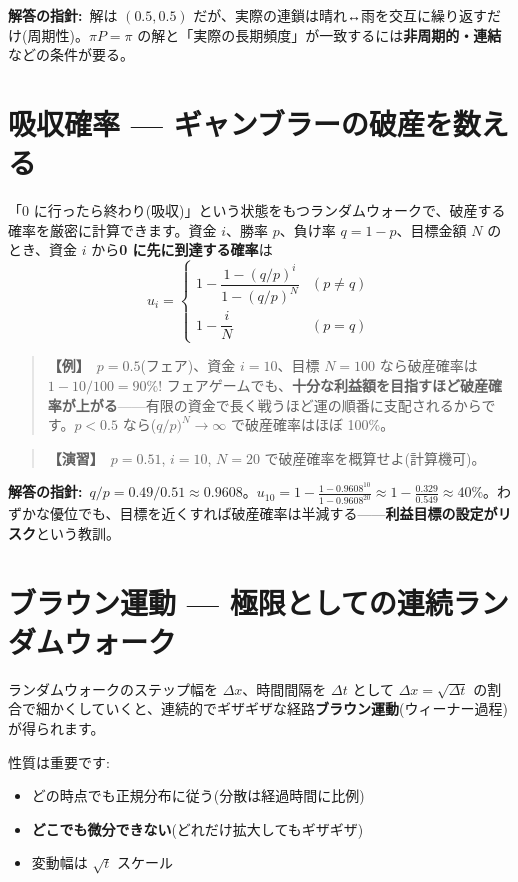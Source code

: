 \documentclass{article}
\begin{document}
\textbf{解答の指針:}\ 解は \((0.5, 0.5)\) だが、実際の連鎖は晴れ↔雨を交互に繰り返すだけ(周期性)。\(\pi P = \pi\) の解と「実際の長期頻度」が一致するには\textbf{非周期的・連結}などの条件が要る。

\section{吸収確率 — ギャンブラーの破産を数える}

「0 に行ったら終わり(吸収)」という状態をもつランダムウォークで、破産する確率を厳密に計算できます。資金 \(i\)、勝率 \(p\)、負け率 \(q = 1-p\)、目標金額 \(N\) のとき、資金 \(i\) から\textbf{0 に先に到達する確率}は
\[ u_i = \begin{cases} 1 - \dfrac{1 - (q/p)^i}{1 - (q/p)^N} & (p \neq q) \\[2mm] 1 - \dfrac{i}{N} & (p = q) \end{cases} \]

\begin{quote}
\textbf{【例】}\ \(p = 0.5\)(フェア)、資金 \(i = 10\)、目標 \(N = 100\) なら破産確率は \(1 - 10/100 = 90\%\)! フェアゲームでも、\textbf{十分な利益額を目指すほど破産確率が上がる}——有限の資金で長く戦うほど運の順番に支配されるからです。\(p < 0.5\) なら(\(q/p)^N \to \infty\) で破産確率はほぼ 100\%。
\end{quote}

\begin{quote}
\textbf{【演習】}\ \(p = 0.51\), \(i = 10\), \(N = 20\) で破産確率を概算せよ(計算機可)。
\end{quote}

\textbf{解答の指針:}\ \(q/p = 0.49/0.51 \approx 0.9608\)。\(u_{10} = 1 - \frac{1 - 0.9608^{10}}{1 - 0.9608^{20}} \approx 1 - \frac{0.329}{0.549} \approx 40\%\)。わずかな優位でも、目標を近くすれば破産確率は半減する——\textbf{利益目標の設定がリスク}という教訓。

\section{ブラウン運動 — 極限としての連続ランダムウォーク}

ランダムウォークのステップ幅を \(\Delta x\)、時間間隔を \(\Delta t\) として \(\Delta x = \sqrt{\Delta t}\) の割合で細かくしていくと、連続的でギザギザな経路\textbf{ブラウン運動}(ウィーナー過程)が得られます。

性質は重要です:
\begin{itemize}
\item どの時点でも正規分布に従う(分散は経過時間に比例)
\item \textbf{どこでも微分できない}(どれだけ拡大してもギザギザ)
\item 変動幅は \(\sqrt{t}\) スケール
\end{itemize}
\end{document}
